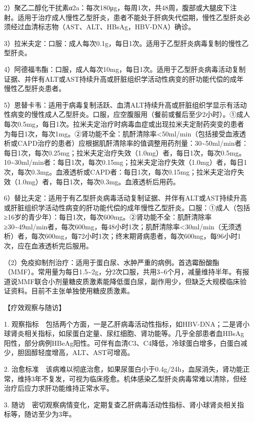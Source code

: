 2）聚乙二醇化干扰素α2a：每次180μg，每周1次，共48周，腹部或大腿皮下注射。适用于治疗成人慢性乙型肝炎，患者不能处于肝病失代偿期，慢性乙型肝炎必须经过血清标志物（AST、ALT、HBsAg，HBV-DNA）确诊。

3）拉米夫定：口服：成人每次0.1g，每日1次。适用于乙型肝炎病毒复制的慢性乙型肝炎。

4）阿德福韦酯：口服，成人每次10mg，每日1次。适用于乙型肝炎病毒活动复制证据、并伴有ALT或AST持续升高或肝脏组织学活动性病变的肝功能代偿的成年慢性乙型肝炎患者。

5）恩替卡韦：适用于病毒复制活跃、血清ALT持续升高或肝脏组织学显示有活动性病变的慢性成人乙型肝炎。口服，应空腹服用（餐前或餐后至少2小时）。①成人每次0.5mg，每日1次。拉米夫定治疗时病毒血症或出现拉米夫定耐药突变的患者为每日1次，每次1mg。②肾功能不全：肌酐清除率\textless{}50ml/min（包括接受血液透析或CAPD治疗的患者）应根据肌酐清除率的值调整用药剂量：30\textasciitilde{}50ml/min者：每日1次，每次0.25mg；拉米夫定治疗失效（1.0mg）者，每日1次，每次0.5mg。10\textasciitilde{}30ml/min者：每日1次，每次0.15mg；拉米夫定治疗失效（1.0mg）者，每日1次，每次0.3mg。血液透析或CAPD者：每日1次，每次0.15mg；拉米夫定治疗失效（1.0mg）者，每日1次，每次0.3mg。血液透析后用药。

6）替比夫定：适用于有乙型肝炎病毒活动复制证据、并伴有ALT或AST持续升高或肝脏组织学活动性病变的肝功能代偿的成年慢性乙型肝炎。口服：①成人（包括≥16岁的青少年）：每日1次，每次600mg。②肾功能不全：肌酐清除率≥30\textasciitilde{}49ml/min者，每次600mg，每48小时1次；肌酐清除率\textless{}30ml/min（无须透析）者，每次600mg，每72小时1次；终末期肾病患者，每次600mg，每96小时1次，应在血液透析完后服用。

（2）免疫抑制剂治疗：适用于蛋白尿、水肿严重的病例。首选霉酚酸酯（MMF）。常用量为每日1.5\textasciitilde{}2g，分2次口服，共用3\textasciitilde{}6个月，减量维持半年。有报道说MMF联合小剂量糖皮质激素能降低蛋白尿，副作用少，但缺乏大规模临床验证资料。目前不主张单独使用糖皮质激素。

【疗效观察与随访】

1.
观察指标　包括两个方面，一是乙肝病毒活动性指标，如HBV-DNA；二是肾小球肾炎相关指标，如尿蛋白定量、尿红细胞、肾功能等。几乎全部患者血HBsAg阳性，部分病例HBeAg阳性。可伴有血清C3、C4降低，冷球蛋白增多，白蛋白减少，胆固醇轻度增高，ALT、AST可增高。

2.
治愈标准　该病难以彻底治愈，如果尿蛋白小于0.4g/24h，血尿消失，肾功能正常，维持3年不复发，可视为临床痊愈。机体感染乙型肝炎病毒常难以清除，但经治疗后应力求肝功能维持正常水平。

3.
随访　密切观察病情变化，定期复查乙肝病毒活动性指标、肾小球肾炎相关指标等，随访至少为3年。


